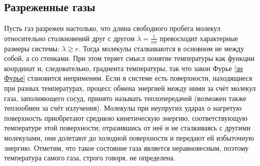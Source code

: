 \documentclass[12pt]{article}
\begin{document}
        \subsection{Разреженные газы}
        Пусть газ разрежен настолько, что длина свободного пробега молекул относительно столкновений друг
        с другом $\lambda = \frac{1}{n\sigma}$ превосходит характерные размеры системы: $\lambda \gtrsim r$. Тогда молекулы
        сталкиваются в основном не между собой, а со стенками. При этом теряет смысл понятие
        температуры как функции координат и, следовательно, градиента температуры, так что закон Фурье \ref{зн Фурье}
        становится неприменим. Если в системе есть поверхности, находящиеся при разных температурах, процесс обмена энергией
        между ними за счёт молекул газа, заполняющего сосуд, принято называть теплопередачей (возможен также теплообмен за счёт излучения). Молекулы
        при неупругих ударах о нагретую поверхность приобретают среднюю
        кинетическую энергию, соответствующую температуре этой поверхности;
        отразившись от неё и не сталкиваясь с другими молекулами, они долетают до
        холодной поверхности и передают ей избыточную энергию. Отметим, что такое состояние газа является неравновесным, поэтому
        температура самого газа, строго говоря, не определена.\\
\end{document}
